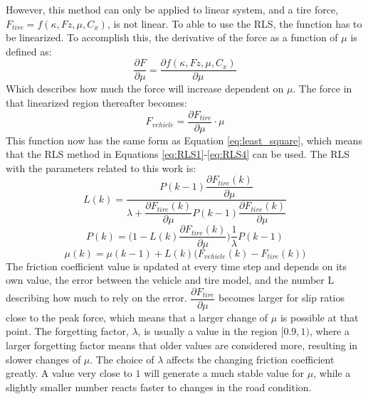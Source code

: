 However, this method can only be applied to linear system, and a tire force, $F_{tire}=f(\kappa, Fz, \mu, C_{x})$, is not linear. To able to use the RLS, the function has to be linearized. To accomplish this, the derivative of the force as a function of $ \mu $ is defined as:
\begin{equation}
	\dfrac{\partial F}{\partial \mu} = \dfrac{\partial f(\kappa, Fz, \mu, C_{x})}{\partial \mu}
\end{equation}
Which describes how much the force will increase dependent on $ \mu $. The force in that linearized region thereafter becomes:
\begin{equation}
	F_{vehicle} = \dfrac{\partial F_{tire}}{\partial \mu} \cdot \mu
\end{equation}
This function now has the same form as Equation \ref{eq:least_square}, which means that the RLS method in Equations \ref{eq:RLS1}-\ref{eq:RLS4} can be used. The RLS with the parameters related to this work is:
\begin{equation}
	L(k) =\dfrac{ P(k-1) \dfrac{\partial F_{tire}(k)}{\partial \mu}}{\lambda + \dfrac{\partial F_{tire}(k)}{\partial \mu} P(k-1) \dfrac{\partial F_{tire}(k)}{\partial \mu}} 
\end{equation}
\begin{equation}
	P(k) = \Bigg( 1 - L(k) \dfrac{\partial F_{tire}(k)}{\partial \mu} \Bigg) \dfrac{1}{\lambda} P(k-1)
\end{equation}
\begin{equation}
	\mu (k) = \mu (k-1) + L(k) \Big( F_{vehicle} (k) - F_{tire} (k) \Big)
\end{equation}
The friction coefficient value is updated at every time step and depends on its own value, the error between the vehicle and tire model, and the number L describing how much to rely on the error. $ \dfrac{\partial F_{tire}}{\partial \mu} $ becomes larger for slip ratios close to the peak force, which means that a larger change of $ \mu $ is possible at that point. The forgetting factor, $ \lambda $, is usually a value in the region $ [0.9, 1) $, where a larger forgetting factor means that older values are considered more, resulting in slower changes of $ \mu $. The choice of $ \lambda $ affects the changing friction coefficient greatly. A value very close to $ 1 $ will generate a much stable value for $ \mu $, while a slightly smaller number reacts faster to changes in the road condition.

